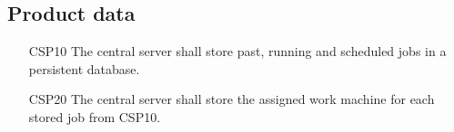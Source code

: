 \subsection{Product data}
\begin{enumerate}
  \item[CSP10] The central server shall store past, running and scheduled \glspl{job} in a persistent database.
  \item[CSP20] The central server shall store the assigned work machine for each stored \gls{job} from CSP10.
\end{enumerate}
